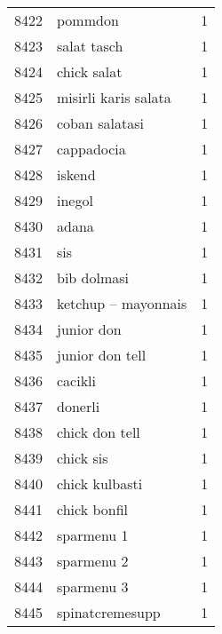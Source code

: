 \begin{tabular}{llr}
8422 &                                            pommdon &      1 \\
8423 &                                        salat tasch &      1 \\
8424 &                                        chick salat &      1 \\
8425 &                               misirli karis salata &      1 \\
8426 &                                     coban salatasi &      1 \\
8427 &                                         cappadocia &      1 \\
8428 &                                             iskend &      1 \\
8429 &                                             inegol &      1 \\
8430 &                                              adana &      1 \\
8431 &                                                sis &      1 \\
8432 &                                        bib dolmasi &      1 \\
8433 &                                ketchup – mayonnais &      1 \\
8434 &                                         junior don &      1 \\
8435 &                                    junior don tell &      1 \\
8436 &                                            cacikli &      1 \\
8437 &                                            donerli &      1 \\
8438 &                                     chick don tell &      1 \\
8439 &                                          chick sis &      1 \\
8440 &                                     chick kulbasti &      1 \\
8441 &                                       chick bonfil &      1 \\
8442 &                                         sparmenu 1 &      1 \\
8443 &                                         sparmenu 2 &      1 \\
8444 &                                         sparmenu 3 &      1 \\
8445 &                                    spinatcremesupp &      1 \\

\end{tabular}
